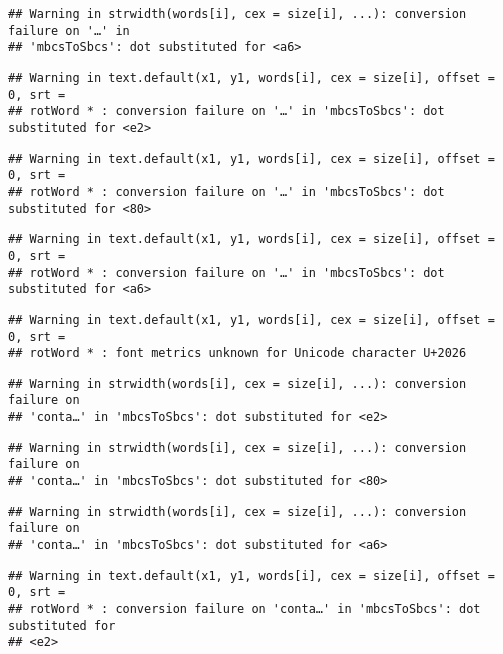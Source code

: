 \documentclass[
]{article}
\begin{document}
\begin{verbatim}
## Warning in strwidth(words[i], cex = size[i], ...): conversion failure on '…' in
## 'mbcsToSbcs': dot substituted for <a6>
\end{verbatim}

\begin{verbatim}
## Warning in text.default(x1, y1, words[i], cex = size[i], offset = 0, srt =
## rotWord * : conversion failure on '…' in 'mbcsToSbcs': dot substituted for <e2>
\end{verbatim}

\begin{verbatim}
## Warning in text.default(x1, y1, words[i], cex = size[i], offset = 0, srt =
## rotWord * : conversion failure on '…' in 'mbcsToSbcs': dot substituted for <80>
\end{verbatim}

\begin{verbatim}
## Warning in text.default(x1, y1, words[i], cex = size[i], offset = 0, srt =
## rotWord * : conversion failure on '…' in 'mbcsToSbcs': dot substituted for <a6>
\end{verbatim}

\begin{verbatim}
## Warning in text.default(x1, y1, words[i], cex = size[i], offset = 0, srt =
## rotWord * : font metrics unknown for Unicode character U+2026
\end{verbatim}

\begin{verbatim}
## Warning in strwidth(words[i], cex = size[i], ...): conversion failure on
## 'conta…' in 'mbcsToSbcs': dot substituted for <e2>
\end{verbatim}

\begin{verbatim}
## Warning in strwidth(words[i], cex = size[i], ...): conversion failure on
## 'conta…' in 'mbcsToSbcs': dot substituted for <80>
\end{verbatim}

\begin{verbatim}
## Warning in strwidth(words[i], cex = size[i], ...): conversion failure on
## 'conta…' in 'mbcsToSbcs': dot substituted for <a6>
\end{verbatim}

\begin{verbatim}
## Warning in text.default(x1, y1, words[i], cex = size[i], offset = 0, srt =
## rotWord * : conversion failure on 'conta…' in 'mbcsToSbcs': dot substituted for
## <e2>
\end{verbatim}
\end{document}
